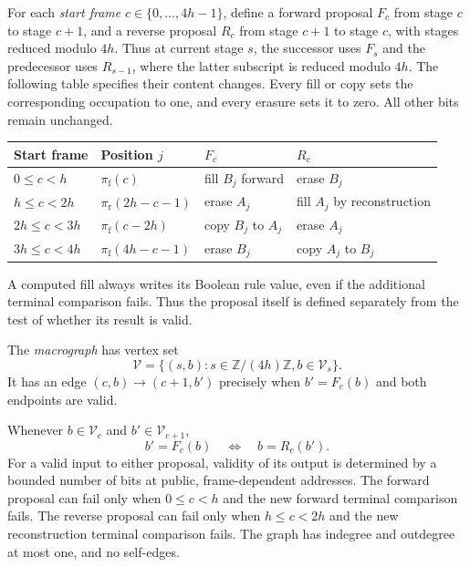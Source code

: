 For each \emph{start frame} $c\in\{0,\ldots,4h-1\}$, define a
forward proposal $F_c$ from stage $c$ to stage $c+1$, and a reverse
proposal $R_c$ from stage $c+1$ to stage $c$, with stages reduced
modulo $4h$.  Thus at current stage $s$, the successor uses $F_s$
and the predecessor uses $R_{s-1}$, where the latter subscript is
reduced modulo $4h$.  The following table specifies their content changes.
Every fill or copy sets the corresponding occupation to one, and
every erasure sets it to zero.  All other bits remain unchanged.
\begin{center}
\begin{tabular}{@{}llll@{}}
\toprule
Start frame & Position $j$ & $F_c$ & $R_c$ \\
\midrule
$0\le c<h$ & $\pi_{\mathrm f}(c)$ & fill $B_j$ forward & erase $B_j$ \\
$h\le c<2h$ & $\pi_{\mathrm r}(2h-c-1)$ & erase $A_j$ & fill $A_j$ by reconstruction \\
$2h\le c<3h$ & $\pi_{\mathrm f}(c-2h)$ & copy $B_j$ to $A_j$ & erase $A_j$ \\
$3h\le c<4h$ & $\pi_{\mathrm f}(4h-c-1)$ & erase $B_j$ & copy $A_j$ to $B_j$ \\
\bottomrule
\end{tabular}
\end{center}
A computed fill always writes its Boolean rule value, even if the
additional terminal comparison fails.  Thus the proposal itself is
defined separately from the test of whether its result is valid.

The \emph{macrograph} has vertex set
\[
 \mathcal V=\{(s,b):s\in\mathbb Z/(4h)\mathbb Z, b\in\mathcal V_s\}.
\]
It has an edge $(c,b)\longrightarrow(c+1,b')$ precisely when
$b'=F_c(b)$ and both endpoints are valid.

\begin{lemma}
\label{macro:local-edges}
Whenever $b\in\mathcal V_c$ and $b'\in\mathcal V_{c+1}$,
\begin{equation}\label{macro:reciprocity}
 b'=F_c(b)\quad\Longleftrightarrow\quad b=R_c(b').
\end{equation}
For a valid input to either proposal, validity of its output is
determined by a bounded number of bits at public, frame-dependent
addresses.  The forward proposal can fail only when $0\le c<h$ and
the new forward terminal comparison fails.  The reverse proposal can
fail only when $h\le c<2h$ and the new reconstruction terminal
comparison fails.  The graph has indegree and outdegree at most one,
and no self-edges.
\end{lemma}

